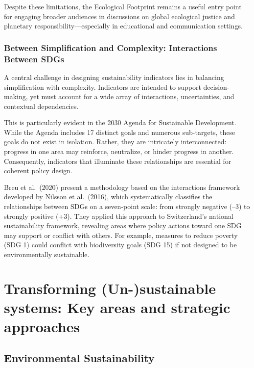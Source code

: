 \documentclass[
  a4paper,
  openany]{book}
\begin{document}
Despite these limitations, the Ecological Footprint remains a useful
entry point for engaging broader audiences in discussions on global
ecological justice and planetary responsibility---especially in
educational and communication settings.

\section{\texorpdfstring{\textbf{Between Simplification and Complexity:
Interactions Between
SDGs}}{Between Simplification and Complexity: Interactions Between SDGs}}\label{between-simplification-and-complexity-interactions-between-sdgs}

A central challenge in designing sustainability indicators lies in
balancing simplification with complexity. Indicators are intended to
support decision-making, yet must account for a wide array of
interactions, uncertainties, and contextual dependencies.

This is particularly evident in the 2030 Agenda for Sustainable
Development. While the Agenda includes 17 distinct goals and numerous
sub-targets, these goals do not exist in isolation. Rather, they are
intricately interconnected: progress in one area may reinforce,
neutralize, or hinder progress in another. Consequently, indicators that
illuminate these relationships are essential for coherent policy design.

Breu et al.~(2020) present a methodology based on the interactions
framework developed by Nilsson et al.~(2016), which systematically
classifies the relationships between SDGs on a seven-point scale: from
strongly negative (--3) to strongly positive (+3). They applied this
approach to Switzerland's national sustainability framework, revealing
areas where policy actions toward one SDG may support or conflict with
others. For example, measures to reduce poverty (SDG 1) could conflict
with biodiversity goals (SDG 15) if not designed to be environmentally
sustainable.

\part{Transforming (Un-)sustainable systems: Key areas and strategic
approaches}

\chapter{Environmental
Sustainability}\label{environmental-sustainability}
\end{document}
